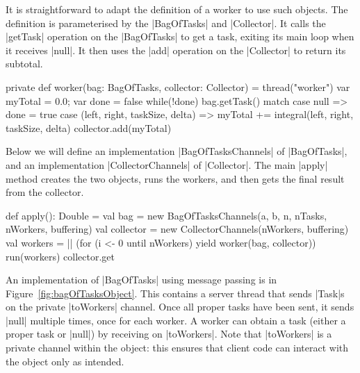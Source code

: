 
It is straightforward to adapt the definition of a worker to use such objects.
The definition is parameterised by the |BagOfTasks| and |Collector|.  It calls
the |getTask| operation on the |BagOfTasks| to get a task, exiting its main
loop when it receives |null|.  It then uses the |add| operation on the
|Collector| to return its subtotal.
%
\begin{mysamepage}
\begin{scala}
  private def worker(bag: BagOfTasks, collector: Collector) = thread("worker"){
    var myTotal = 0.0; var done = false
    while(!done) bag.getTask() match{
      case null => done = true
      case (left, right, taskSize, delta) =>
        myTotal += integral(left, right, taskSize, delta)
    }
    collector.add(myTotal)
  }
\end{scala}
\end{mysamepage}

Below we will define an implementation |BagOfTasksChannels| of |BagOfTasks|,
and an implementation |CollectorChannels| of |Collector|.  The main |apply|
method creates the two objects, runs the workers, and then gets the
final result from the collector.
\begin{scala}
  def apply(): Double = {
    val bag = new BagOfTasksChannels(a, b, n, nTasks, nWorkers, buffering)
    val collector = new CollectorChannels(nWorkers, buffering)
    val workers = || (for (i <- 0 until nWorkers) yield worker(bag, collector))
    run(workers)
    collector.get
  }
\end{scala}


An implementation of |BagOfTasks| using message passing is in
Figure~\ref{fig:bagOfTasksObject}.  This contains a server thread that sends
|Task|s on the private |toWorkers| channel.  Once all proper tasks have been
sent, it sends |null| multiple times, once for each worker.  A worker can
obtain a task (either a proper task or |null|) by receiving on |toWorkers|.
Note that |toWorkers| is a private channel within the object: this ensures
that client code can interact with the object only as intended.


